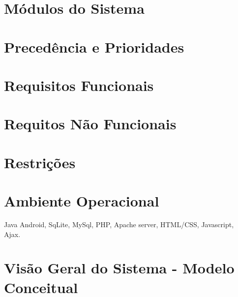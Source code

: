 \documentclass[13pt]{article}
\begin{document}
\section*{Módulos do Sistema}
\section*{Precedência e Prioridades}
\section*{Requisitos Funcionais}
\section*{Requitos Não Funcionais}
\section*{Restrições}
\section*{Ambiente Operacional}
Java Android, SqLite, MySql, PHP, Apache server, HTML/CSS, Javascript, Ajax.
\section*{Visão Geral do Sistema - Modelo Conceitual}


 
\end{document}
